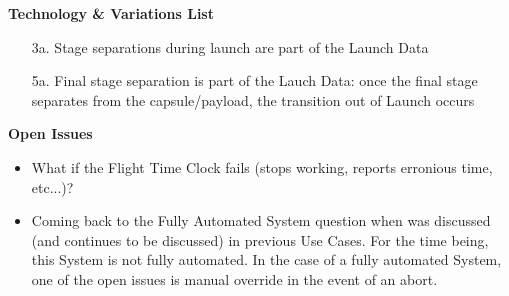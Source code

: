 \documentclass[letterpaper]{article}
\begin{document}
\textbf{Technology \& Variations List}
\begin{itemize}
\item[3a.]Stage separations during launch are part of the Launch
Data
\item[5a.]Final stage separation is part of the Lauch Data:
once the final stage separates from the capsule/payload, the
transition out of Launch occurs
\end{itemize}
\textbf{Open Issues}
\begin{itemize}
\item What if the Flight Time Clock fails (stops working, reports
erronious time, etc...)?
\item Coming back to the Fully Automated System question when was
discussed (and continues to be discussed) in previous Use Cases.  For
the time being, this System is not fully automated.  In the case
of a fully automated System, one of the open issues is manual override
in the event of an abort.
\end{itemize}
\end{document}
